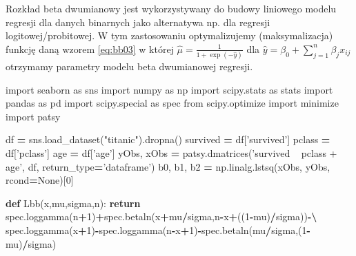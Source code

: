 \documentclass[polish,]{book}
\newenvironment{Shaded}{\begin{snugshade}}{\end{snugshade}}
\newcommand{\ControlFlowTok}[1]{\textcolor[rgb]{0.13,0.29,0.53}{\textbf{#1}}}
\newcommand{\DecValTok}[1]{\textcolor[rgb]{0.00,0.00,0.81}{#1}}
\newcommand{\ImportTok}[1]{#1}
\newcommand{\KeywordTok}[1]{\textcolor[rgb]{0.13,0.29,0.53}{\textbf{#1}}}
\newcommand{\NormalTok}[1]{#1}
\newcommand{\OperatorTok}[1]{\textcolor[rgb]{0.81,0.36,0.00}{\textbf{#1}}}
\newcommand{\StringTok}[1]{\textcolor[rgb]{0.31,0.60,0.02}{#1}}
\newcommand{\VariableTok}[1]{\textcolor[rgb]{0.00,0.00,0.00}{#1}}
\begin{document}
Rozkład beta dwumianowy jest wykorzystywany do budowy liniowego modelu regresji dla danych binarnych jako alternatywa np. dla regresji logitowej/probitowej. W tym zastosowaniu optymalizujemy (maksymalizacja) funkcję daną wzorem \eqref{eq:bb03} w której \(\hat{\mu}=\frac{1}{1+\exp(-\hat{y})}\) dla \(\hat{y}=\beta_0+\sum_{j=1}^{n}\beta_j x_{ij}\) otrzymamy parametry modelu beta dwumianowej regresji.

\begin{Shaded}
\begin{Highlighting}[]
\ImportTok{import}\NormalTok{ seaborn }\ImportTok{as}\NormalTok{ sns}
\ImportTok{import}\NormalTok{ numpy }\ImportTok{as}\NormalTok{ np}
\ImportTok{import}\NormalTok{ scipy.stats }\ImportTok{as}\NormalTok{ stats}
\ImportTok{import}\NormalTok{ pandas }\ImportTok{as}\NormalTok{ pd}
\ImportTok{import}\NormalTok{ scipy.special }\ImportTok{as}\NormalTok{ spec}
\ImportTok{from}\NormalTok{ scipy.optimize }\ImportTok{import}\NormalTok{ minimize}
\ImportTok{import}\NormalTok{ patsy}

\NormalTok{df }\OperatorTok{=}\NormalTok{ sns.load_dataset(}\StringTok{"titanic"}\NormalTok{).dropna()}
\NormalTok{survived }\OperatorTok{=}\NormalTok{ df[}\StringTok{'survived'}\NormalTok{]}
\NormalTok{pclass }\OperatorTok{=}\NormalTok{ df[}\StringTok{'pclass'}\NormalTok{]}
\NormalTok{age }\OperatorTok{=}\NormalTok{ df[}\StringTok{'age'}\NormalTok{]}
\NormalTok{yObs, xObs }\OperatorTok{=}\NormalTok{ patsy.dmatrices(}\StringTok{'survived ~ pclass + age'}\NormalTok{, df, return_type}\OperatorTok{=}\StringTok{'dataframe'}\NormalTok{)}
\NormalTok{b0, b1, b2 }\OperatorTok{=}\NormalTok{ np.linalg.lstsq(xObs, yObs, rcond}\OperatorTok{=}\VariableTok{None}\NormalTok{)[}\DecValTok{0}\NormalTok{]}

\KeywordTok{def}\NormalTok{ Lbb(x,mu,sigma,n):}
    \ControlFlowTok{return}\NormalTok{ spec.loggamma(n}\OperatorTok{+}\DecValTok{1}\NormalTok{)}\OperatorTok{+}\NormalTok{spec.betaln(x}\OperatorTok{+}\NormalTok{mu}\OperatorTok{/}\NormalTok{sigma,n}\OperatorTok{-}\NormalTok{x}\OperatorTok{+}\NormalTok{((}\DecValTok{1}\OperatorTok{-}\NormalTok{mu)}\OperatorTok{/}\NormalTok{sigma))}\OperatorTok{-\textbackslash{}}
\NormalTok{           spec.loggamma(x}\OperatorTok{+}\DecValTok{1}\NormalTok{)}\OperatorTok{-}\NormalTok{spec.loggamma(n}\OperatorTok{-}\NormalTok{x}\OperatorTok{+}\DecValTok{1}\NormalTok{)}\OperatorTok{-}\NormalTok{spec.betaln(mu}\OperatorTok{/}\NormalTok{sigma,(}\DecValTok{1}\OperatorTok{-}\NormalTok{mu)}\OperatorTok{/}\NormalTok{sigma)}


\end{Highlighting}
\end{Shaded}
\end{document}
